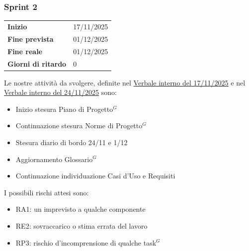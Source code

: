 \subsubsection{Sprint 2}


\begin{tabular}{p{} p{}}
	\textbf{Inizio} & 17/11/2025 \\
	\textbf{Fine prevista} & 01/12/2025 \\
	\textbf{Fine reale} & 01/12/2025 \\
	\textbf{Giorni di ritardo} & 0
\end{tabular}
\newline \newline 
Le nostre attività da svolgere, definite nel \href{https://nullpointersgroup.github.io/Documentazione/output/RTB/Verbali%20Interni/2025-11-17_verbale_interno.pdf}{Verbale interno del 17/11/2025} e nel \href{https://nullpointersgroup.github.io/Documentazione/output/RTB/Verbali%20Interni/2025-11-24_verbale_interno.pdf}{Verbale interno del 24/11/2025} sono:
\begin{itemize}[itemsep=5pt, parsep=1pt, label=$\scriptstyle\bullet$]
	\item Inizio stesura Piano di Progetto$^G$
	\item Continuazione stesura Norme di Progetto$^G$
	\item Stesura diario di bordo 24/11 e 1/12
	\item Aggiornamento Glossario$^G$
	\item Continuazione individuazione Casi d'Uso e Requisiti
\end{itemize}


I possibili rischi attesi sono:
\begin{itemize}[itemsep=5pt, parsep=1pt, label=$\scriptstyle\bullet$]
	\item RA1: un imprevisto a qualche componente
	\item RE2: sovraccarico o stima errata del lavoro
	\item RP3: rischio d'incomprensione di qualche task$^G$
\end{itemize}


